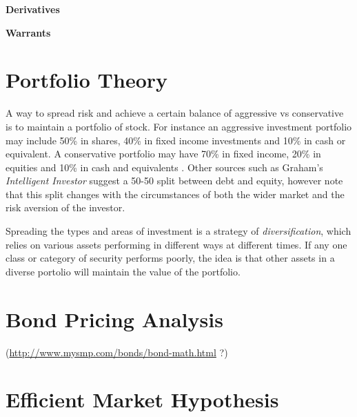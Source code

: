 \textbf{Derivatives} \TODO{}

\textbf{Warrants} \TODO{}


\section{Portfolio Theory}

A way to spread risk and achieve a certain balance of aggressive vs conservative is to maintain a portfolio of stock. For instance an aggressive investment portfolio may include 50\% in shares, 40\% in fixed income investments and 10\% in cash or equivalent. A conservative portfolio may have 70\% in fixed income, 20\% in equities and 10\% in cash and equivalents \cite{investing101}. Other sources such as Graham's {\it Intelligent Investor} suggest a 50-50 split between debt and equity, however note that this split changes with the circumstances of both the wider market and the risk aversion of the investor\cite{intelligentinvestor}.

Spreading the types and areas of investment is a strategy of {\it diversification}, which relies on various assets performing in different ways at different times. If any one class or category of security performs poorly, the idea is that other assets in a diverse portolio will maintain the value of the portfolio.


\section{Bond Pricing Analysis}

\TODO{} (\url{http://www.mysmp.com/bonds/bond-math.html} ?)

\section{Efficient Market Hypothesis}

\TODO{}


